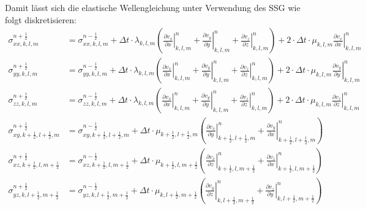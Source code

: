 \documentclass[pdftex,a4paper,parskip,listof=totoc,bibliography=totoc,onehalfspacing,12pt]{scrreprt}
\begin{document}
Damit lässt sich die elastische Wellengleichung unter Verwendung des SSG wie folgt diskretisieren:
\begin{align*}
	\sigma_{xx,k,l,m}^{n+\frac{1}{2}} &= \sigma_{xx,k,l,m}^{n-\frac{1}{2}} + \Delta t \cdot \lambda_{k,l,m} \left( \left.\frac{\partial v_x}{\partial x}\right\rvert_{k,l,m}^n + \left.\frac{\partial v_y}{\partial y}\right\rvert_{k,l,m}^n + \left.\frac{\partial v_z}{\partial z}\right\rvert_{k,l,m}^n \right) + 2 \cdot \Delta t  \cdot\mu_{k,l,m} \left.\frac{\partial v_x}{\partial x}\right\rvert_{k,l,m}^n\\
	\sigma_{yy,k,l,m}^{n+\frac{1}{2}} &= \sigma_{yy,k,l,m}^{n-\frac{1}{2}} + \Delta t \cdot \lambda_{k,l,m} \left( \left.\frac{\partial v_x}{\partial x}\right\rvert_{k,l,m}^n + \left.\frac{\partial v_y}{\partial y}\right\rvert_{k,l,m}^n + \left.\frac{\partial v_z}{\partial z}\right\rvert_{k,l,m}^n \right) + 2 \cdot \Delta t \cdot \mu_{k,l,m} \left.\frac{\partial v_y}{\partial y}\right\rvert_{k,l,m}^n\\
	\sigma_{zz,k,l,m}^{n+\frac{1}{2}} &= \sigma_{zz,k,l,m}^{n-\frac{1}{2}} + \Delta t \cdot \lambda_{k,l,m} \left( \left.\frac{\partial v_x}{\partial x}\right\rvert_{k,l,m}^n + \left.\frac{\partial v_y}{\partial y}\right\rvert_{k,l,m}^n + \left.\frac{\partial v_z}{\partial z}\right\rvert_{k,l,m}^n \right) + 2 \cdot \Delta t \cdot \mu_{k,l,m} \left.\frac{\partial v_z}{\partial z}\right\rvert_{k,l,m}^n\\
	\sigma_{xy,k+\frac{1}{2},l+\frac{1}{2},m}^{n+\frac{1}{2}} &= \sigma_{xy,k+\frac{1}{2},l+\frac{1}{2},m}^{n-\frac{1}{2}} + \Delta t \cdot \mu_{k+\frac{1}{2},l+\frac{1}{2},m} \left( \left.\frac{\partial v_x}{\partial y}\right\rvert_{k+\frac{1}{2},l+\frac{1}{2},m}^n + \left.\frac{\partial v_y}{\partial x}\right\rvert_{k+\frac{1}{2},l+\frac{1}{2},m}^n \right)\\
	\sigma_{xz,k+\frac{1}{2},l,m+\frac{1}{2}}^{n+\frac{1}{2}} &= \sigma_{xz,k+\frac{1}{2},l,m+\frac{1}{2}}^{n-\frac{1}{2}} + \Delta t \cdot \mu_{k+\frac{1}{2},l,m+\frac{1}{2}} \left( \left.\frac{\partial v_x}{\partial z}\right\rvert_{k+\frac{1}{2},l,m+\frac{1}{2}}^n + \left.\frac{\partial v_z}{\partial x}\right\rvert_{k+\frac{1}{2},l,m+\frac{1}{2}}^n \right)\\
	\sigma_{yz,k,l+\frac{1}{2},m+\frac{1}{2}}^{n+\frac{1}{2}} &= \sigma_{yz,k,l+\frac{1}{2},m+\frac{1}{2}}^{n-\frac{1}{2}} + \Delta t \cdot \mu_{k,l+\frac{1}{2},m+\frac{1}{2}} \left( \left.\frac{\partial v_y}{\partial z}\right\rvert_{k,l+\frac{1}{2},m+\frac{1}{2}}^n + \left.\frac{\partial v_z}{\partial y}\right\rvert_{k,l+\frac{1}{2},m+\frac{1}{2}}^n \right)\\

\end{align*}
\end{document}
